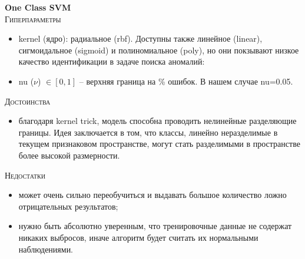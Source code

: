 \documentclass[12pt]{article}
\begin{document}

    \textbf{One Class SVM} \\

    \noindent \textsc{Гиперпараметры}
    \begin{itemize}
        \item kernel (ядро): радиальное (rbf). Доступны также линейное (linear), сигмоидальное (sigmoid) и полиномиальное (poly), но они покзывают низкое качество идентификации в задаче поиска аномалий:
        \item nu ($\nu$) $\in [0, 1]$ – верхняя граница на \% ошибок. В нашем случае nu=0.05.
    \end{itemize}

    \noindent \textsc{Достоинства}
    \begin{itemize}
        \item благодаря kernel trick, модель способна проводить нелинейные разделяющие границы. Идея заключается в том, что классы, линейно неразделимые в текущем признаковом пространстве, могут стать разделимыми в пространстве более высокой размерности.
    \end{itemize}

    \noindent \textsc{Недостатки}
    \begin{itemize}
        \item может очень сильно переобучиться и выдавать большое количество ложно отрицательных результатов;
        \item нужно быть абсолютно уверенным, что тренировочные данные не содержат никаких выбросов, иначе алгоритм будет считать их нормальными наблюдениями.
    \end{itemize}
\end{document}
